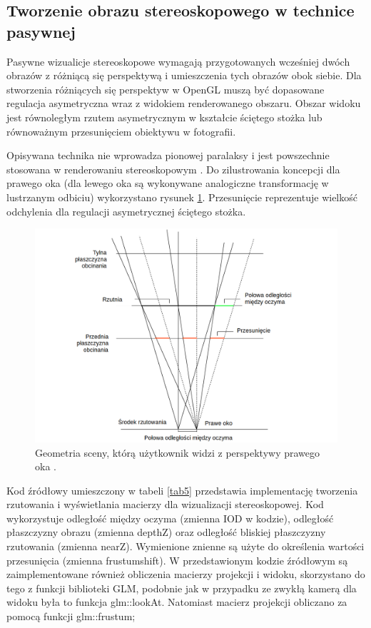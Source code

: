 \subsection{Tworzenie obrazu stereoskopowego w technice pasywnej}
Pasywne wizualicje stereoskopowe wymagają przygotowanych wcześniej dwóch obrazów z różniącą się perspektywą i umieszczenia tych obrazów obok siebie. Dla stworzenia różniących się perspektyw w OpenGL muszą być dopasowane regulacja asymetryczna wraz z widokiem renderowanego obszaru. Obszar widoku jest równoległym rzutem asymetrycznym w kształcie ściętego stożka lub równoważnym przesunięciem obiektywu w fotografii. 

Opisywana technika nie wprowadza pionowej paralaksy i jest powszechnie stosowana w renderowaniu stereoskopowym \cite{openglCookbook}. Do zilustrowania koncepcji dla prawego oka (dla lewego oka są wykonywane analogiczne transformację w lustrzanym odbiciu) wykorzystano rysunek \ref{rys10}. Przesunięcie reprezentuje wielkość odchylenia dla regulacji asymetrycznej ściętego stożka.

\begin{figure}[H]
		\centering
 		\includegraphics[width=12cm]{stereoscopicGL.png}
    	\caption{Geometria sceny, którą użytkownik widzi z perspektywy prawego oka \cite{openglCookbook}.}
 		\label{rys10}
\end{figure}

Kod źródłowy umieszczony w tabeli \ref{tab5} przedstawia implementację tworzenia rzutowania i wyświetlania macierzy dla wizualizacji stereoskopowej. Kod wykorzystuje odległość między oczyma (zmienna IOD w kodzie), odległość płaszczyzny obrazu (zmienna depthZ) oraz odległość bliskiej płaszczyzny rzutowania (zmienna nearZ).  Wymienione znienne są użyte do określenia wartości przesunięcia (zmienna frustumshift). W przedstawionym kodzie źródłowym są zaimplementowane również obliczenia macierzy projekcji i widoku, skorzystano do tego z funkcji biblioteki GLM, podobnie jak w przypadku ze zwykłą kamerą dla widoku była to funkcja glm::lookAt. Natomiast macierz projekcji obliczano za pomocą funkcji glm::frustum;

